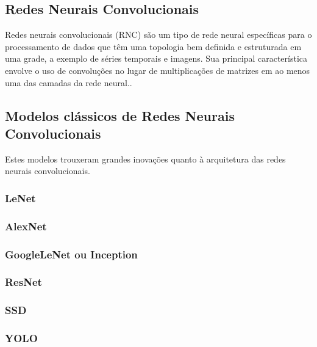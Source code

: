 \subsection{Redes Neurais Convolucionais}
Redes neurais convolucionais (RNC) são um tipo de rede neural específicas para o processamento de dados que têm uma topologia bem definida e estruturada em uma grade, a exemplo de séries temporais e imagens. Sua principal característica envolve o uso de convoluções no lugar de multiplicações de matrizes em ao menos uma das camadas da rede neural.\cite{goodfellow2016deep}.

\subsection{Modelos clássicos de Redes Neurais Convolucionais}
Estes modelos trouxeram grandes inovações quanto à arquitetura das redes neurais convolucionais.
\subsubsection{LeNet}

\subsubsection{AlexNet}

\subsubsection{GoogleLeNet ou Inception}

\subsubsection{ResNet}

\subsubsection{SSD}

\subsubsection{YOLO}
